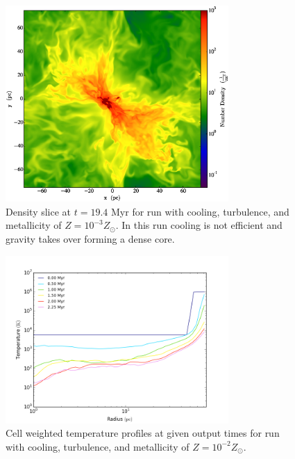 \documentclass[useAMS,usenatbib]{mn2e}
\begin{document}
\begin{figure}
\begin{center}
\mbox{\includegraphics[width=8.5cm]{Images/density_slice}}
\end{center}
\caption{\label{fig:slice_turbulence} Density slice at $t=19.4$ Myr for run with
cooling, turbulence, and metallicity of $Z=10^{-3}Z_\odot$. In this run cooling is
not efficient and gravity takes over forming a dense core. }
\end{figure}
\begin{figure}
\begin{center}
\mbox{\includegraphics[width=8.5cm]{Images/temperature_series_0_01}}
\end{center}
\caption{\label{fig:temperature_series} Cell weighted temperature profiles
at given output times for run with cooling, turbulence, and
metallicity of $Z=10^{-2}Z_\odot$.}
\end{figure}
\end{document}
